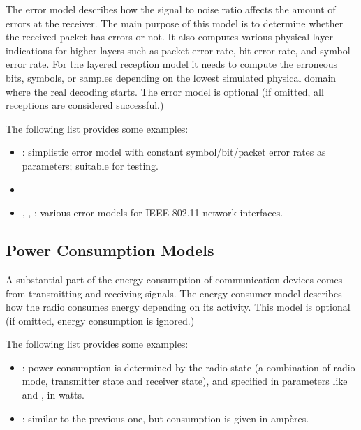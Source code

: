 The error model describes how the signal to noise ratio affects the amount of
errors at the receiver. The main purpose of this model is to determine whether
the received packet has errors or not. It also computes various physical
layer indications for higher layers such as packet error rate, bit error rate,
and symbol error rate. For the layered reception model it needs to compute the
erroneous bits, symbols, or samples depending on the lowest simulated physical
domain where the real decoding starts. The error model is optional (if omitted,
all receptions are considered successful.)

The following list provides some examples:

\begin{itemize}
  \item {}: simplistic error model with constant
    symbol/bit/packet error rates as parameters; suitable for testing.
  \item {}
  \item {}, ,
    : various error models for IEEE 802.11
    network interfaces.
\end{itemize}

\subsection{Power Consumption Models}
\label{sec:phy:power-consumption-models}

A substantial part of the energy consumption of communication devices comes from
transmitting and receiving signals. The energy consumer model describes how the
radio consumes energy depending on its activity. This model is optional (if
omitted, energy consumption is ignored.)

The following list provides some examples:

\begin{itemize}
  \item {}: power consumption is
    determined by the radio state (a combination of radio mode,
    transmitter state and receiver state), and specified in
    parameters like  and
    , in watts.
  \item {}: similar to the previous
    one, but consumption is given in amp\`eres.
\end{itemize}

